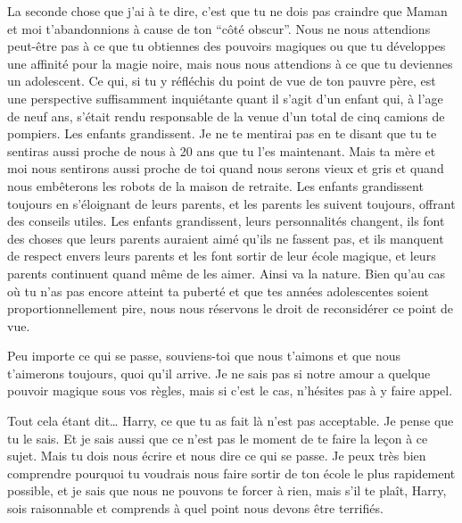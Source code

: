 \begin{writtenNote}
La seconde chose que j'ai à te dire, c'est que tu ne dois pas craindre que Maman et moi t'abandonnions à cause de ton “côté obscur”. Nous ne nous attendions peut-être pas à ce que tu obtiennes des pouvoirs magiques ou que tu développes une affinité pour la magie noire, mais nous nous attendions à ce que tu deviennes un adolescent. Ce qui, si tu y réfléchis du point de vue de ton pauvre père, est une perspective suffisamment inquiétante quant il s'agit d'un enfant qui, à l'age de neuf ans, s'était rendu responsable de la venue d'un total de cinq camions de pompiers. Les enfants grandissent. Je ne te mentirai pas en te disant que tu te sentiras aussi proche de nous à 20 ans que tu l'es maintenant. Mais ta mère et moi nous sentirons aussi proche de toi quand nous serons vieux et gris et quand nous embêterons les robots de la maison de retraite. Les enfants grandissent toujours en s'éloignant de leurs parents, et les parents les suivent toujours, offrant des conseils utiles. Les enfants grandissent, leurs personnalités changent, ils font des choses que leurs parents auraient aimé qu'ils ne fassent pas, et ils manquent de respect envers leurs parents et les font sortir de leur école magique, et leurs parents continuent quand même de les aimer. Ainsi va la nature. Bien qu'au cas où tu n'as pas encore atteint ta puberté et que tes années adolescentes soient proportionnellement pire, nous nous réservons le droit de reconsidérer ce point de vue.

Peu importe ce qui se passe, souviens-toi que nous t'aimons et que nous t'aimerons toujours, quoi qu'il arrive. Je ne sais pas si notre amour a quelque pouvoir magique sous vos règles, mais si c'est le cas, n'hésites pas à y faire appel.

Tout cela étant dit… Harry, ce que tu as fait là n'est pas acceptable. Je pense que tu le sais. Et je sais aussi que ce n'est pas le moment de te faire la leçon à ce sujet. Mais tu dois nous écrire et nous dire ce qui se passe. Je peux très bien comprendre pourquoi tu voudrais nous faire sortir de ton école le plus rapidement possible, et je sais que nous ne pouvons te forcer à rien, mais s'il te plaît, Harry, sois raisonnable et comprends à quel point nous devons être terrifiés.


\end{writtenNote}
